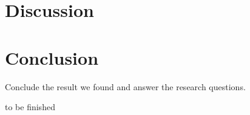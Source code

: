 \documentclass[acmtog]{acmart}
\begin{document}


\section{Discussion}




\section{Conclusion}
Conclude the result we found and answer the research questions.


\begin{acks}
to be finished
\end{acks}





\end{document}
